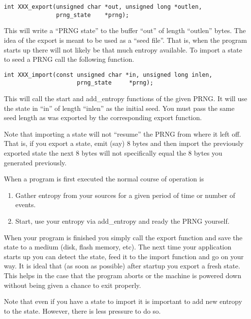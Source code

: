 \documentclass[a4paper]{book}
\begin{document}
\begin{verbatim}
int XXX_export(unsigned char *out, unsigned long *outlen, 
               prng_state    *prng);
\end{verbatim}

This will write a ``PRNG state'' to the buffer ``out'' of length ``outlen'' bytes.  The idea of 
the export is meant to be used as a ``seed file''.  That is, when the program starts up there will not likely
be that much entropy available.   To import a state to seed a PRNG call the following function.

\begin{verbatim}
int XXX_import(const unsigned char *in, unsigned long inlen, 
                     prng_state     *prng);
\end{verbatim}

This will call the start and add\_entropy functions of the given PRNG.  It will use the state in
``in'' of length ``inlen'' as the initial seed.  You must pass the same seed length as was exported
by the corresponding export function.

Note that importing a state will not ``resume'' the PRNG from where it left off.  That is, if you export
a state, emit (say) 8 bytes and then import the previously exported state the next 8 bytes will not 
specifically equal the 8 bytes you generated previously.

When a program is first executed the normal course of operation is 

\begin{enumerate}
   \item Gather entropy from your sources for a given period of time or number of events.
   \item Start, use your entropy via add\_entropy and ready the PRNG yourself.
\end{enumerate}

When your program is finished you simply call the export function and save the state to a medium (disk,
flash memory, etc).  The next time your application starts up you can detect the state, feed it to the 
import function and go on your way.  It is ideal that (as soon as possible) after startup you export a
fresh state.  This helps in the case that the program aborts or the machine is powered down without
being given a chance to exit properly.  

Note that even if you have a state to import it is important to add new entropy to the state.  However,
there is less pressure to do so.  
\end{document}
